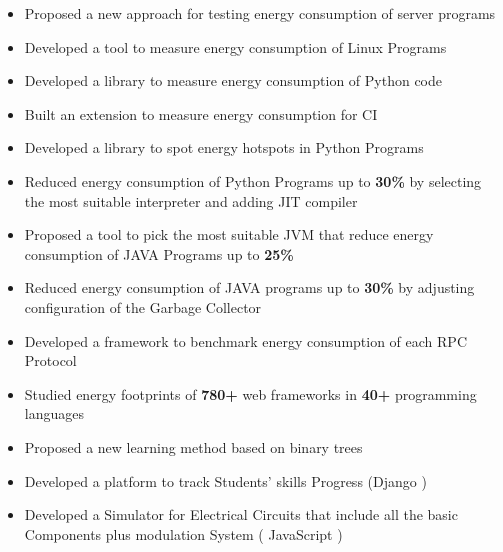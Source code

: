 \documentclass[10pt,a4paper,ragged2e,withhyper]{altacv}
\begin{document}
\begin{paracol}{2}
  \medskip

  \begin{itemize}
    \item Proposed a new approach for testing energy consumption of server programs
    \item Developed a tool to measure energy consumption of Linux Programs
    \item Developed a library to measure energy consumption of Python code
    \item Built an extension to measure energy consumption for CI
    \item Developed a library to spot energy hotspots in Python Programs
  \end{itemize}

  \begin{itemize}
    \item Reduced energy consumption of Python Programs up to \textbf{30\%} by selecting the most suitable interpreter and adding JIT compiler
    \item Proposed a tool to pick the most suitable JVM that reduce energy consumption of JAVA Programs up to \textbf{25\%}
    \item Reduced energy consumption of JAVA programs up to \textbf{30\%} by adjusting configuration of the Garbage Collector
  \end{itemize}

  \begin{itemize}
    \item Developed a framework to benchmark energy consumption of each RPC Protocol
    \item Studied energy footprints of \textbf{780+} web frameworks in \textbf{40+} programming languages
  \end{itemize}

  \divider
  \begin{itemize}
    \item Proposed a new learning method based on binary trees
    \item Developed a platform to track Students' skills Progress (Django )
    \item Developed a Simulator for Electrical Circuits that include all the basic Components plus modulation System ( JavaScript )
  \end{itemize}
  \divider


\end{paracol}
\end{document}
